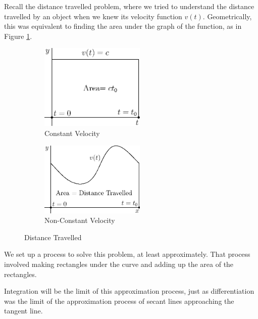\documentclass[fleqn]{report}
\begin{document}
Recall the distance travelled problem, where we tried to
understand the distance travelled by an object when we knew
its velocity function $v(t)$. Geometrically, this was
equivalent to finding the area under the graph of the
function, as in Figure \ref{Distance Travelled 2}. 

\begin{figure}[ht]
\centering
\begin{subfigure}{.5\textwidth}
 \centering
 \includegraphics[width=5cm]{figure14.eps}
 \caption{Constant Velocity}
\end{subfigure}%
\begin{subfigure}{.5\textwidth}
 \centering
 \includegraphics[width=5cm]{figure15.eps}
 \caption{Non-Constant Velocity}
\end{subfigure}
\caption{Distance Travelled}
\label{Distance Travelled 2}
\end{figure}

We set up a process to solve this problem, at
least approximately. That process involved making rectangles
under the curve and adding up the area of the rectangles.

Integration will be the limit of this approximation process,
just as differentiation was the limit of the approximation
process of secant lines approaching the tangent line. 
\clearpage
\end{document}
